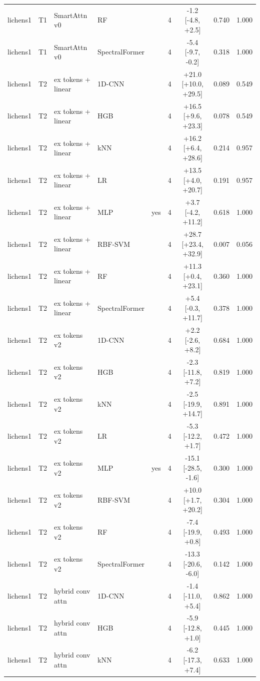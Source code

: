 \begin{tabular}{lllllcccc}
lichens1 & T1 & SmartAttn v0 & RF &  & 4 & -1.2 [-4.8, +2.5] & 0.740 & 1.000 \\
lichens1 & T1 & SmartAttn v0 & SpectralFormer &  & 4 & -5.4 [-9.7, -0.2] & 0.318 & 1.000 \\
lichens1 & T2 & ex tokens + linear & 1D-CNN &  & 4 & +21.0 [+10.0, +29.5] & 0.089 & 0.549 \\
lichens1 & T2 & ex tokens + linear & HGB &  & 4 & +16.5 [+9.6, +23.3] & 0.078 & 0.549 \\
lichens1 & T2 & ex tokens + linear & kNN &  & 4 & +16.2 [+6.4, +28.6] & 0.214 & 0.957 \\
lichens1 & T2 & ex tokens + linear & LR &  & 4 & +13.5 [+4.0, +20.7] & 0.191 & 0.957 \\
lichens1 & T2 & ex tokens + linear & MLP & yes & 4 & +3.7 [-4.2, +11.2] & 0.618 & 1.000 \\
lichens1 & T2 & ex tokens + linear & RBF-SVM &  & 4 & +28.7 [+23.4, +32.9] & 0.007 & 0.056 \\
lichens1 & T2 & ex tokens + linear & RF &  & 4 & +11.3 [+0.4, +23.1] & 0.360 & 1.000 \\
lichens1 & T2 & ex tokens + linear & SpectralFormer &  & 4 & +5.4 [-0.3, +11.7] & 0.378 & 1.000 \\
lichens1 & T2 & ex tokens v2 & 1D-CNN &  & 4 & +2.2 [-2.6, +8.2] & 0.684 & 1.000 \\
lichens1 & T2 & ex tokens v2 & HGB &  & 4 & -2.3 [-11.8, +7.2] & 0.819 & 1.000 \\
lichens1 & T2 & ex tokens v2 & kNN &  & 4 & -2.5 [-19.9, +14.7] & 0.891 & 1.000 \\
lichens1 & T2 & ex tokens v2 & LR &  & 4 & -5.3 [-12.2, +1.7] & 0.472 & 1.000 \\
lichens1 & T2 & ex tokens v2 & MLP & yes & 4 & -15.1 [-28.5, -1.6] & 0.300 & 1.000 \\
lichens1 & T2 & ex tokens v2 & RBF-SVM &  & 4 & +10.0 [+1.7, +20.2] & 0.304 & 1.000 \\
lichens1 & T2 & ex tokens v2 & RF &  & 4 & -7.4 [-19.9, +0.8] & 0.493 & 1.000 \\
lichens1 & T2 & ex tokens v2 & SpectralFormer &  & 4 & -13.3 [-20.6, -6.0] & 0.142 & 1.000 \\
lichens1 & T2 & hybrid conv attn & 1D-CNN &  & 4 & -1.4 [-11.0, +5.4] & 0.862 & 1.000 \\
lichens1 & T2 & hybrid conv attn & HGB &  & 4 & -5.9 [-12.8, +1.0] & 0.445 & 1.000 \\
lichens1 & T2 & hybrid conv attn & kNN &  & 4 & -6.2 [-17.3, +7.4] & 0.633 & 1.000 \\

\end{tabular}
